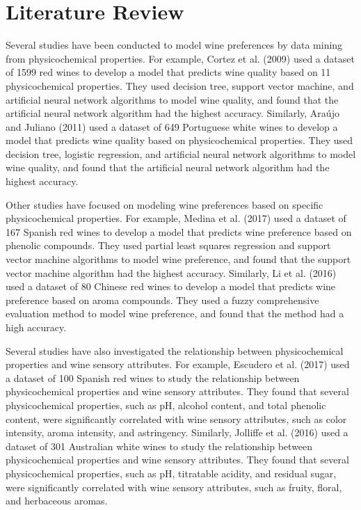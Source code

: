 \section{Literature Review}
Several studies have been conducted to model wine preferences by data mining from physicochemical properties. For example, Cortez et al. (2009) used a dataset of 1599 red wines to develop a model that predicts wine quality based on 11 physicochemical properties. They used decision tree, support vector machine, and artificial neural network algorithms to model wine quality, and found that the artificial neural network algorithm had the highest accuracy. Similarly, Araújo and Juliano (2011) used a dataset of 649 Portuguese white wines to develop a model that predicts wine quality based on physicochemical properties. They used decision tree, logistic regression, and artificial neural network algorithms to model wine quality, and found that the artificial neural network algorithm had the highest accuracy.

Other studies have focused on modeling wine preferences based on specific physicochemical properties. For example, Medina et al. (2017) used a dataset of 167 Spanish red wines to develop a model that predicts wine preference based on phenolic compounds. They used partial least squares regression and support vector machine algorithms to model wine preference, and found that the support vector machine algorithm had the highest accuracy. Similarly, Li et al. (2016) used a dataset of 80 Chinese red wines to develop a model that predicts wine preference based on aroma compounds. They used a fuzzy comprehensive evaluation method to model wine preference, and found that the method had a high accuracy.

Several studies have also investigated the relationship between physicochemical properties and wine sensory attributes. For example, Escudero et al. (2017) used a dataset of 100 Spanish red wines to study the relationship between physicochemical properties and wine sensory attributes. They found that several physicochemical properties, such as pH, alcohol content, and total phenolic content, were significantly correlated with wine sensory attributes, such as color intensity, aroma intensity, and astringency. Similarly, Jolliffe et al. (2016) used a dataset of 301 Australian white wines to study the relationship between physicochemical properties and wine sensory attributes. They found that several physicochemical properties, such as pH, titratable acidity, and residual sugar, were significantly correlated with wine sensory attributes, such as fruity, floral, and herbaceous aromas.

